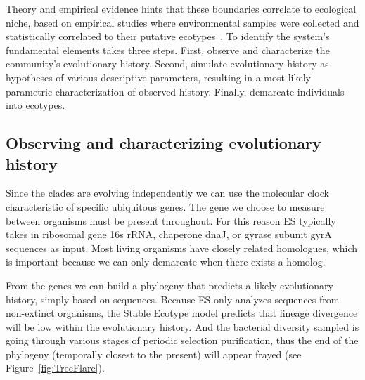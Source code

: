 Theory and empirical evidence hints that these boundaries correlate to ecological niche, based on empirical studies where environmental samples were collected and statistically correlated to their putative ecotypes~\cite{cohan2007systematics, cohan2006sequence, ward2006cyanobacterial, cohan2006toward}.
To identify the system's fundamental elements takes three steps.
First, observe and characterize the community's evolutionary history.
Second, simulate evolutionary history as hypotheses of various descriptive parameters, resulting in a most likely parametric characterization of observed history.
Finally, demarcate individuals into ecotypes.

\subsection*{Observing and characterizing evolutionary history}
Since the clades are evolving independently we can use the molecular clock characteristic of specific ubiquitous genes.
The gene we choose to measure between organisms must be present throughout.
For this reason ES typically takes in ribosomal gene 16s rRNA, chaperone dnaJ, or gyrase subunit gyrA sequences  as input. Most living organisms have closely related homologues, which is important because we can only demarcate when there exists a homolog.

From the genes we can build a phylogeny that predicts a likely evolutionary history, simply based on sequences.
Because ES only analyzes sequences from non-extinct organisms, the Stable Ecotype model predicts that lineage divergence will be low within the evolutionary history.
And the bacterial diversity sampled is going through various stages of periodic selection purification, thus the end of the phylogeny (temporally closest to the present) will appear frayed (see Figure~\ref{fig:TreeFlare}).

